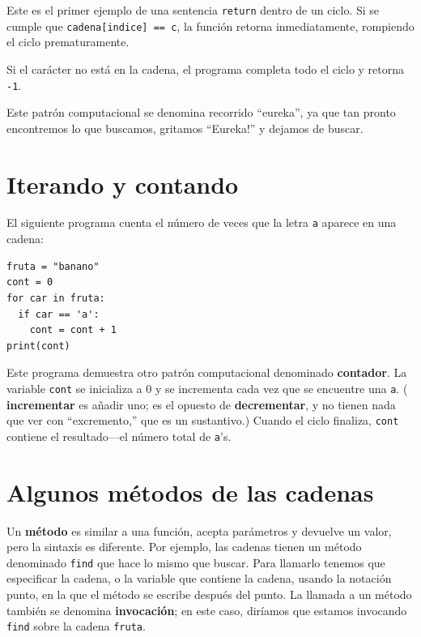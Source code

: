 Este es el primer ejemplo de una sentencia \texttt{return} dentro
de un ciclo. Si se cumple que \texttt{cadena{[}indice{]} == c}, la
función retorna inmediatamente, rompiendo el ciclo prematuramente.

Si el carácter no está en la cadena, el programa completa todo el
ciclo y retorna \texttt{-1}.

Este patrón computacional se denomina recorrido ``eureka'', ya que
tan pronto encontremos lo que buscamos, gritamos ``Eureka!'' y dejamos
de buscar.

\section{Iterando y contando}

\label{counter}  

El siguiente programa cuenta el número de veces que la letra \texttt{a}
aparece en una cadena:
\begin{verbatim}
fruta = "banano"
cont = 0
for car in fruta:
  if car == 'a':
    cont = cont + 1
print(cont)
\end{verbatim}
 Este programa demuestra otro patrón computacional denominado \textbf{contador}.
La variable \texttt{cont} se inicializa a 0 y se incrementa cada vez
que se encuentre una \texttt{a}. ( \textbf{incrementar} es añadir
uno; es el opuesto de \textbf{decrementar}, y no tienen nada que ver
con ``excremento,'' que es un sustantivo.) Cuando el ciclo finaliza,
\texttt{cont} contiene el resultado—el número total de \texttt{a}'s.

\section{Algunos métodos de las cadenas}

  
  

Un \textbf{método} es similar a una función, acepta parámetros y devuelve
un valor, pero la sintaxis es diferente. Por ejemplo, las cadenas
tienen un método denominado \texttt{find} que hace lo mismo que buscar.
Para llamarlo tenemos que especificar la cadena, o la variable que
contiene la cadena, usando la notación punto, en la que el método
se escribe después del punto. La llamada a un método también se denomina
\textbf{invocación}; en este caso, diríamos que estamos invocando
\texttt{find} sobre la cadena \texttt{fruta}.

